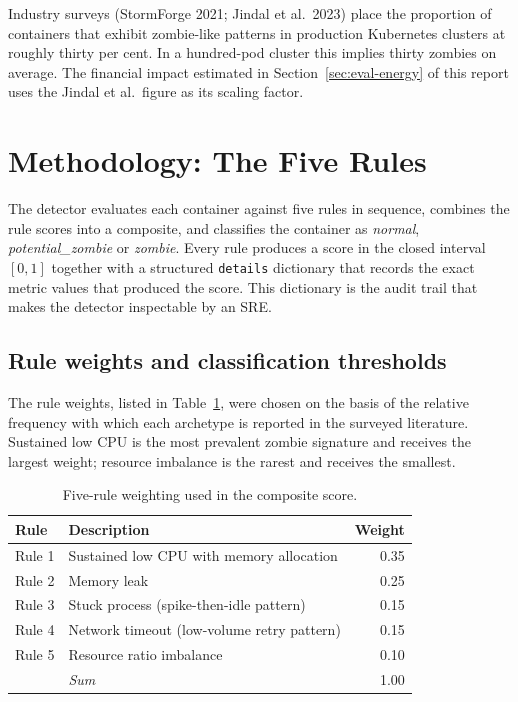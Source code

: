 \documentclass[11pt,a4paper,oneside]{article}
\begin{document}
Industry surveys (StormForge 2021; Jindal et al.\ 2023) place the
proportion of containers that exhibit zombie-like patterns in production
Kubernetes clusters at roughly thirty per cent. In a hundred-pod cluster
this implies thirty zombies on average. The financial impact estimated in
Section~\ref{sec:eval-energy} of this report uses the Jindal et al.\
figure as its scaling factor.

\section{Methodology: The Five Rules}
\label{sec:methodology}

The detector evaluates each container against five rules in sequence,
combines the rule scores into a composite, and classifies the container as
\emph{normal}, \emph{potential\_zombie} or \emph{zombie}. Every rule
produces a score in the closed interval \([0, 1]\) together with a
structured \texttt{details} dictionary that records the exact metric
values that produced the score. This dictionary is the audit trail that
makes the detector inspectable by an SRE.

\subsection{Rule weights and classification thresholds}

The rule weights, listed in Table~\ref{tab:rule-weights}, were chosen on
the basis of the relative frequency with which each archetype is reported
in the surveyed literature. Sustained low CPU is the most prevalent
zombie signature and receives the largest weight; resource imbalance is
the rarest and receives the smallest.

\begin{table}[H]
\centering
\caption{Five-rule weighting used in the composite score.}
\label{tab:rule-weights}
\begin{tabularx}{0.85\textwidth}{lXr}
\toprule
\textbf{Rule} & \textbf{Description} & \textbf{Weight} \\
\midrule
Rule 1 & Sustained low CPU with memory allocation     & 0.35 \\
Rule 2 & Memory leak                                  & 0.25 \\
Rule 3 & Stuck process (spike-then-idle pattern)      & 0.15 \\
Rule 4 & Network timeout (low-volume retry pattern)   & 0.15 \\
Rule 5 & Resource ratio imbalance                     & 0.10 \\
\midrule
       & \emph{Sum}                                    & 1.00 \\
\bottomrule
\end{tabularx}
\end{table}
\end{document}

